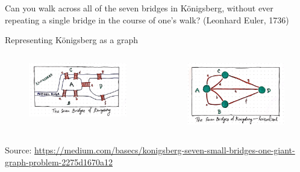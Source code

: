 \documentclass[aspectratio=169]{beamer}
\begin{document}
\begin{frame}
	
	\small Can you walk across all of the seven bridges in K\"onigsberg, without ever repeating a single bridge in the course of one's walk? (Leonhard Euler, 1736)
	
	\vspace{2mm}
	
	\small Representing K\"onigsberg as a graph
	
	\begin{columns}
		
		\begin{column}{0.5\textwidth}
			
			\begin{figure}
				\centering
				\includegraphics[width=1.1\linewidth]{images/konigsberg_2}
			\end{figure}
			
		\end{column}
		
		\begin{column}{0.5\textwidth}
			\begin{figure}
				\centering
				\includegraphics[width=1.0\linewidth]{images/konigsberg_3}
			\end{figure}
		\end{column}
		
	\end{columns}
	\vspace{4mm}
	\tiny \tiny Source: \url{https://medium.com/basecs/konigsberg-seven-small-bridges-one-giant-graph-problem-2275d1670a12}
\end{frame}
\end{document}
